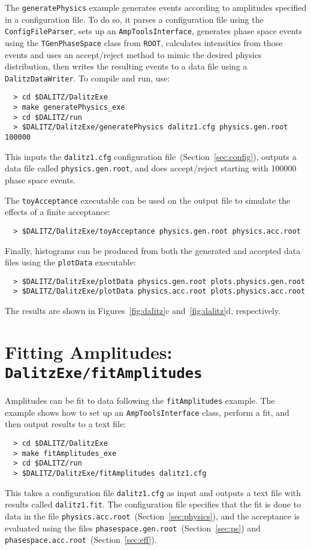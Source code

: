 \documentclass[11pt]{article}
\begin{document}
The {\tt generatePhysics} example generates events according to amplitudes specified in a configuration file.  To do so, it parses a configuration file using the {\tt ConfigFileParser}, sets up an {\tt AmpToolsInterface}, generates phase space events using the {\tt TGenPhaseSpace} class from {\tt ROOT}, calculates intensities from those events and uses an accept/reject method to mimic the desired physics distribution, then writes the resulting events to a data file using a {\tt DalitzDataWriter}.  To compile and run, use:
\begin{verbatim}
  > cd $DALITZ/DalitzExe
  > make generatePhysics_exe
  > cd $DALITZ/run
  > $DALITZ/DalitzExe/generatePhysics dalitz1.cfg physics.gen.root 100000
\end{verbatim}
This inputs the {\tt dalitz1.cfg} configuration file~(Section~\ref{sec:config}), outputs a data file called {\tt physics.gen.root}, and does accept/reject starting with 100000 phase space events.

The {\tt toyAcceptance} executable can be used on the output file to simulate the effects of a finite acceptance:
\begin{verbatim}
  > $DALITZ/DalitzExe/toyAcceptance physics.gen.root physics.acc.root
\end{verbatim}
Finally, histograms can be produced from both the generated and accepted data files using the {\tt plotData} executable:
\begin{verbatim}
  > $DALITZ/DalitzExe/plotData physics.gen.root plots.physics.gen.root
  > $DALITZ/DalitzExe/plotData physics.acc.root plots.physics.acc.root
\end{verbatim}
The results are shown in Figures~\ref{fig:dalitz}c and~\ref{fig:dalitz}d, respectively.

\section{Fitting Amplitudes: \\
{\tt DalitzExe/fitAmplitudes}}
\label{sec:fit}

Amplitudes can be fit to data following the {\tt fitAmplitudes} example.  The example shows how to set up an {\tt AmpToolsInterface} class, perform a fit, and then output results to a text file:
\begin{verbatim}
  > cd $DALITZ/DalitzExe
  > make fitAmplitudes_exe
  > cd $DALITZ/run
  > $DALITZ/DalitzExe/fitAmplitudes dalitz1.cfg
\end{verbatim}
This takes a configuration file {\tt dalitz1.cfg} as input and outputs a text file with results called {\tt dalitz1.fit}.  The configuration file specifies that the fit is done to data in the file {\tt physics.acc.root}~(Section~\ref{sec:physics}), and the acceptance is evaluated using the files {\tt phasespace.gen.root}~(Section~\ref{sec:ps}) and {\tt phasespace.acc.root}~(Section~\ref{sec:eff}).
\end{document}
